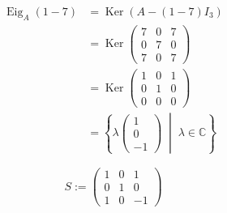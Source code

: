 \documentclass[a4paper,12pt]{article}
\begin{document}
\begin{enumerate}[label=\alph*)]
    \begin{align*}
        \operatorname{Eig}_A(1-7) &= \operatorname{Ker}(A - (1-7)I_3) \\
            &= \operatorname{Ker}\begin{pmatrix}
                7 & 0 & 7 \\
                0 & 7 & 0 \\
                7 & 0 & 7
              \end{pmatrix} \\
            &= \operatorname{Ker}\begin{pmatrix}
                1 & 0 & 1 \\
                0 & 1 & 0 \\
                0 & 0 & 0
              \end{pmatrix} \\
            &= \left\{ \lambda \begin{pmatrix} 1 \\ 0 \\ -1 \end{pmatrix} \;\middle|\; \lambda \in \mathbb{C} \right\}
    \end{align*}

    \[
        S := \begin{pmatrix}
            1 & 0 & 1 \\
            0 & 1 & 0 \\
            1 & 0 & -1
          \end{pmatrix}
    \]


\end{enumerate}
\end{document}
